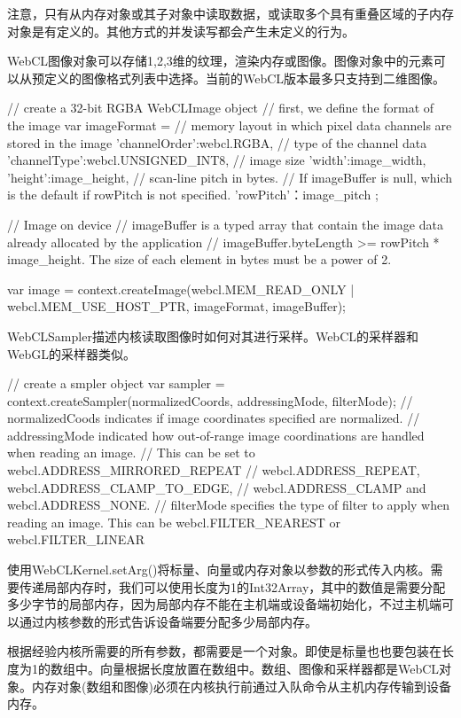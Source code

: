 注意，只有从内存对象或其子对象中读取数据，或读取多个具有重叠区域的子内存对象是有定义的。其他方式的并发读写都会产生未定义的行为。

WebCL图像对象可以存储1,2,3维的纹理，渲染内存或图像。图像对象中的元素可以从预定义的图像格式列表中选择。当前的WebCL版本最多只支持到二维图像。

\begin{codebox}[javascript]
// create a 32-bit RGBA WebCLImage object
// first, we define the format of the image
var imageFormat = {
  // memory layout in which pixel data channels are stored in the image
  'channelOrder':webcl.RGBA,
  // type of the channel data
  'channelType':webcl.UNSIGNED_INT8,
  // image size
  'width':image_width,
  'height':image_height,
  // scan-line pitch in bytes.
  // If imageBuffer is null, which is the default if rowPitch is not specified.
  'rowPitch'：image_pitch
};

// Image on device
// imageBuffer is a typed array that contain the image data already allocated by the application
// imageBuffer.byteLength >= rowPitch * image_height. The size of each element in bytes must be a power of 2.

var image = context.createImage(webcl.MEM_READ_ONLY | webcl.MEM_USE_HOST_PTR, imageFormat, imageBuffer);
\end{codebox}

WebCLSampler描述内核读取图像时如何对其进行采样。WebCL的采样器和WebGL的采样器类似。

\begin{codebox}[javascript]
// create a smpler object
var sampler = context.createSampler(normalizedCoords, addressingMode, filterMode);
// normalizedCoods indicates if image coordinates specified are normalized.
// addressingMode indicated how out-of-range image coordinations are handled when reading an image.
// This can be set to webcl.ADDRESS_MIRRORED_REPEAT
// webcl.ADDRESS_REPEAT, webcl.ADDRESS_CLAMP_TO_EDGE,
// webcl.ADDRESS_CLAMP and webcl.ADDRESS_NONE.
// filterMode specifies the type of filter to apply when reading an image. This can be webcl.FILTER_NEAREST or webcl.FILTER_LINEAR
\end{codebox}

使用WebCLKernel.setArg()将标量、向量或内存对象以参数的形式传入内核。需要传递局部内存时，我们可以使用长度为1的Int32Array，其中的数值是需要分配多少字节的局部内存，因为局部内存不能在主机端或设备端初始化，不过主机端可以通过内核参数的形式告诉设备端要分配多少局部内存。

根据经验内核所需要的所有参数，都需要是一个对象。即使是标量也也要包装在长度为1的数组中。向量根据长度放置在数组中。数组、图像和采样器都是WebCL对象。内存对象(数组和图像)必须在内核执行前通过入队命令从主机内存传输到设备内存。

